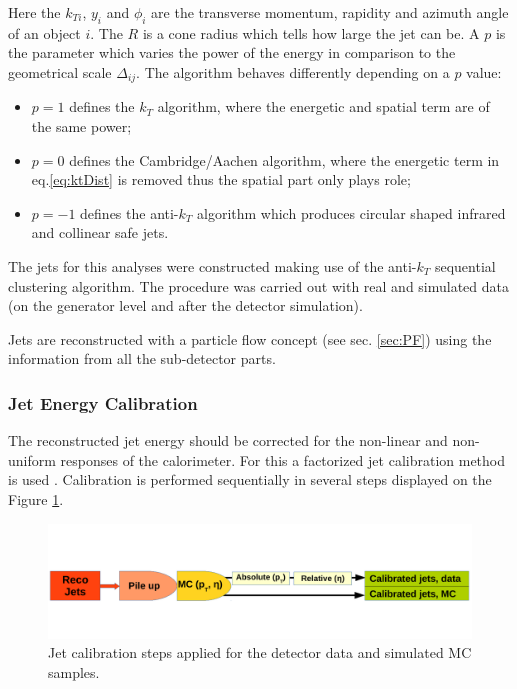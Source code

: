 Here the $k_{Ti}$, $y_{i}$ and $\phi_i$ are the transverse momentum, rapidity and azimuth angle of an object $i$. The $R$ is a cone radius which tells 
how large the jet can be. A $p$ is the parameter which varies the power of the energy in comparison to the geometrical scale $\Delta_{ij}$.
The algorithm behaves differently depending on a $p$ value:

\begin{itemize}
 \item $p = 1$ defines the $k_{T}$ algorithm, where the energetic and spatial term are of the same power;
 \item $p = 0$ defines the Cambridge/Aachen algorithm, where the energetic term in eq.\ref{eq:ktDist} is removed thus the spatial part only plays role;
 \item $p = -1$ defines the anti-$k_{T}$ algorithm which produces circular shaped infrared and collinear safe jets.
\end{itemize}

The jets for this analyses were constructed making use of the anti-$k_{T}$ sequential clustering algorithm. The procedure was carried out with real and
simulated data (on the generator level and after the detector simulation).

Jets are reconstructed with a particle flow concept (see sec. \ref{sec:PF}) using the information from all the sub-detector parts.

\subsubsection{Jet Energy Calibration}\label{ssec:JCal}

The reconstructed jet energy should be corrected for the non-linear and non-uniform responses of the calorimeter. For this a factorized jet calibration
method is used \cite{2011JInst...611002C}. Calibration is performed sequentially in several steps displayed on the Figure \ref{fig:JECsc}.

\begin{figure}[h]
  \centering
  \includegraphics[width=1.0\textwidth]{04_event_reconstruction/plots/JEC.pdf}
  \caption{Jet calibration steps applied for the detector data and simulated MC samples.}
  \label{fig:JECsc}
\end{figure}

